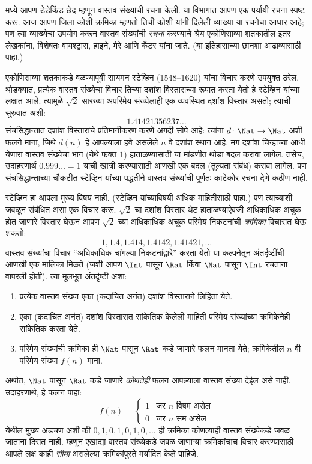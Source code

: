 \documentclass[../../../include/open-logic-section]{subfiles}
\begin{document}


 मध्ये आपण डेडेकिंड छेद म्हणून वास्तव संख्यांची रचना
केली. या विभागात आपण एक पर्यायी रचना स्पष्ट करू. आज आपण जिला कोशी क्रमिका
म्हणतो तिची कोशी यांनी दिलेली व्याख्या या रचनेचा आधार आहे; पण त्या
व्याख्येचा उपयोग करून वास्तव संख्यांची \emph{रचना} करण्याचे श्रेय
एकोणिसाव्या शतकातील इतर लेखकांना, विशेषतः वायश्ट्रास, हाइने, मेरे आणि
कँटर यांना जाते. (या इतिहासाच्या छानशा आढाव्यासाठी
\citeauthor{OConnorRobertson:RN} \citeyear{OConnorRobertson:RN} पाहा.)

एकोणिसाव्या शतकाकडे वळण्यापूर्वी सायमन स्टेव्हिन (1548--1620) यांचा
विचार करणे उपयुक्त ठरेल. थोडक्यात, प्रत्येक वास्तव संख्येचा विचार तिच्या
दशांश विस्ताराच्या रूपात करता येतो हे स्टेव्हिन यांच्या लक्षात आले.
त्यामुळे $\sqrt{2}$ सारख्या अपरिमेय संख्येलाही एक व्यवस्थित दशांश विस्तार
असतो; त्याची सुरुवात अशी:
\[
	1.41421356237\ldots
\]
संचसिद्धान्तात दशांश विस्तारांचे प्रतिमानीकरण करणे अगदी सोपे आहे: त्यांना
$d \colon \Nat \to \Nat$ अशी फलने माना, जिथे $d(n)$ हे आपल्याला हवे
असलेले $n$ वे दशांश स्थान आहे. मग दशांश चिन्हाच्या आधी येणारा वास्तव
संख्येचा भाग (येथे फक्त $1$) हाताळण्यासाठी या मांडणीत थोडा बदल करावा
लागेल. तसेच, उदाहरणार्थ $0.999\ldots = 1$ याची खात्री करण्यासाठी आणखी
एक बदल (तुल्यता संबंध) करावा लागेल. पण संचसिद्धान्ताच्या चौकटीत
स्टेव्हिन यांच्या पद्धतीने वास्तव संख्यांची पूर्णतः काटेकोर रचना देणे
कठीण नाही.

स्टेव्हिन हा आपला मुख्य विषय नाही. (स्टेव्हिन यांच्याविषयी अधिक माहितीसाठी
\citealt{KatzKatz2012} पाहा.) पण त्याच्याशी जवळून संबंधित असा एक विचार
करू. $\sqrt{2}$ चा दशांश विस्तार थेट हाताळण्याऐवजी अधिकाधिक अचूक होत
जाणारे विस्तार घेऊन आपण $\sqrt{2}$ च्या अधिकाधिक अचूक परिमेय निकटनांची
\emph{क्रमिका} विचारात घेऊ शकतो:
\[
1, 1.4, 1.414, 1.4142, 1.41421,\ldots
\]
वास्तव संख्यांचा विचार “अधिकाधिक चांगल्या निकटनांद्वारे” करता येतो या
कल्पनेतून अंतर्दृष्टींची आणखी एक मालिका मिळते (जशी आपण $\Int$ पासून
$\Rat$ किंवा $\Nat$ पासून $\Int$ रचताना वापरली होती). त्या मूलभूत
अंतर्दृष्टी अशा:
\begin{enumerate}
	\item प्रत्येक वास्तव संख्या एका (कदाचित अनंत) दशांश विस्ताराने
	लिहिता येते.
	\item एका (कदाचित अनंत) दशांश विस्तारात सांकेतिक केलेली माहिती
	परिमेय संख्यांच्या क्रमिकेनेही सांकेतिक करता येते.
	\item परिमेय संख्यांची क्रमिका ही $\Nat$ पासून $\Rat$ कडे जाणारे
	फलन मानता येते; क्रमिकेतील $n$ वी परिमेय संख्या $f(n)$ माना.
\end{enumerate}
अर्थात, $\Nat$ पासून $\Rat$ कडे जाणारे \emph{कोणतेही} फलन आपल्याला वास्तव
संख्या देईल असे नाही. उदाहरणार्थ, हे फलन पाहा:
\[
	f(n) =\begin{cases}
			1 & \text{जर }n\text{ विषम असेल}\\
			0 &\text{जर }n\text{ सम असेल}
		\end{cases}
\]
येथील मुख्य अडचण अशी की $0,1,0,1,0,1,0,\ldots$ ही क्रमिका कोणत्याही
वास्तव संख्येकडे जवळ जाताना दिसत नाही. म्हणून एखाद्या वास्तव संख्येकडे
जवळ जाणाऱ्या क्रमिकांचाच विचार करण्यासाठी आपले लक्ष काही \emph{सीमा}
असलेल्या क्रमिकांपुरते मर्यादित केले पाहिजे.
\end{document}
